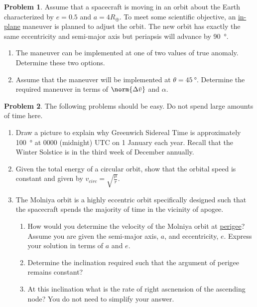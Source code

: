 \documentclass[10pt]{article}
\theoremstyle{definition}
\newtheorem{prob}{Problem}[section]
\newenvironment{subprob}%
{\renewcommand{\theenumi}{\alph{enumi}}\renewcommand{\labelenumi}{(\theenumi)}\begin{enumerate}}%
{\end{enumerate}}%
\newcommand{\extrapage}{\clearpage\newpage\null\newpage}
\begin{document}
\extrapage
\extrapage

\begin{prob}
    Assume that a spacecraft is moving in an orbit about the Earth characterized by \( e = 0.5\) and \( a = 4 R_\oplus\).
    To meet some scientific objective, an \underline{in-plane} maneuver is planned to adjust the orbit.
    The new orbit has exactly the same eccentricity and semi-major axis but periapsis will advance by \SI{90}{\degree}.
    \begin{subprob}
        \item The maneuver can be implemented at one of two values of true anomaly. 
            Determine these two options.
        \item Assume that the maneuver will be implemented at \( \theta = \SI{45}{\degree}\).
            Determine the required maneuver in terms of \( \norm{\Delta \bar v} \) and \(\alpha\).
    \end{subprob}
\end{prob}

\extrapage
\extrapage

\begin{prob}
The following problems should be easy. 
Do not spend large amounts of time here.
\begin{subprob}
\item Draw a picture to explain why Greenwich Sidereal Time is approximately \SI{100}{\degree} at 0000 (midnight) UTC on 1 January each year.
    Recall that the Winter Solstice is in the third week of December annually.

    \vspace{8cm}
\item Given the total energy of a circular orbit, show that the orbital speed is constant and given by \( v_{circ} = \sqrt{\frac{\mu}{r}}\).

    \vspace{5cm}

\item The Molniya orbit is a highly eccentric orbit specifically designed such that the spacecraft spends the majority of time in the vicinity of apogee.

    \begin{subprob}

    \item How would you determine the velocity of the Molniya orbit  at \underline{perigee}?
    Assume you are given the semi-major axis, \( a \), and eccentricity, \( e\).
    Express your solution in terms of \( a \) and \( e\).

    \vspace{4cm}

        \item Determine the inclination required such that the argument of perigee remains constant?

            \vspace{5cm}
        \item At this inclination what is the rate of right ascnension of the ascending node? 
            You do not need to simplify your answer.
    \end{subprob}
\end{subprob}
\end{prob}
\end{document}
